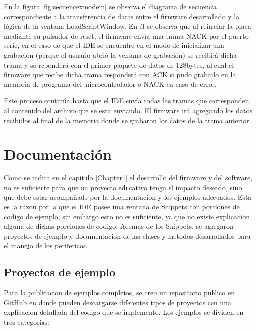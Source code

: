 En la figura \ref{fig:secuencexmodem} se observa el diagrama de secuencia correspondiente a la transferencia de datos entre el firmware desarrollado y la lógica de la ventana LoadScriptWindow.
En él se observa que al reiniciar la placa mediante su pulsador de reset, el firmware envía una trama NACK por el puerto serie, en el caso de que el IDE se encuentre en el modo de inicializar una grabación (porque el usuario abrió la ventana de grabación) se recibirá dicha trama y se reponderá con el primer paquete de datos de 128bytes, al cual el firmware que recibe dicha trama responderá con ACK si pudo grabarlo en la memoria de programa del microcontrolador o NACK en caso de error. 

Este proceso continúa hasta que el IDE envía todas las tramas que corresponden al contenido del archivo que se esta enviando.
El firmware irá agregando los datos recibidos al final de la memoria donde se grabaron los datos de la trama anterior.



\section{Documentación}

Como se indica en el capitulo \ref{Chapter1} el desarrollo del firmware y del software, no es suficiente para que un proyecto educativo tenga el impacto deseado, sino que debe estar acompañado por la documentacion y los ejemplos adecuados. Esta es la razon por la que el IDE posee una ventana de Snippets con porciones de codigo de ejemplo, sin embargo esto no es suficiente, ya que no existe explicacion alguna de dichas porciones de codigo. 
Ademas de los Snippets, se agregaron proyectos de ejemplo y documentacion de las clases y metodos desarrollados para el manejo de los perifericos.

\subsection{Proyectos de ejemplo} 

Para la publicacion de ejemplos completos, se creo un repositorio publico en GitHub\cite{repoejemplos} en donde pueden descargarse diferentes tipos de proyectos con una explicacion detallada del codigo que se implemento. Los ejemplos se dividen en tres categorias:

